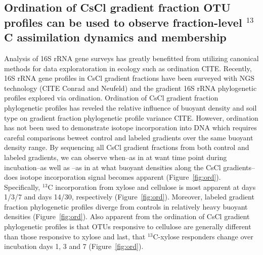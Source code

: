 \subsection{Ordination of CsCl gradient fraction OTU profiles can be used to
observe fraction-level $^{13}$C assimilation dynamics and membership}
Analysis of 16S rRNA gene surveys has greatly benefitted from utilizing
canonical methods for data exploratoration in ecology such as ordination CITE. 
Recently, 16S rRNA gene profiles in CsCl gradient fractions have been surveyed
with NGS technology (CITE Conrad and Neufeld) and the gradient 16S rRNA 
phylogenetic profiles explored via ordination. Ordination of CsCl gradient fraction
phylogenetic profiles has reveled the relative influence of buoyant density and 
soil type on gradient fraction phylogenetic profile variance CITE. However, ordination
has not been used to demonstrate isotope incorporation into DNA which requires careful
comparisons beweet control and labeled gradients over the same buoyant density range. By
sequencing all CsCl gradient fractions from both control and labeled gradients, we can 
observe when--as in at want time point during incubation--as well as --as in
at what buoyant densities along the CsCl gradients--does isotope incorporation signal 
becomes apparent (Figure~\ref{fig:ord}). Specifically, $^{13}$C incorporation from xylose
and cellulose is most apparent at days 1/3/7 and days 14/30, respectively 
(Figure~\ref{fig:ord}). Moreover, labeled gradient fraction phylogenetic profiles diverge 
from controls in relatively heavy buoyant densities (Figure~\ref{fig:ord}). Also apparent
from the ordination of CsCl gradient phylogenetic profiles is that OTUs responsive to 
cellulose are generally different than those responsive to xylose  and last, that 
$^{13}$C-xylose responders change over incubation days 1, 3 and 7 (Figure~\ref{fig:ord}).

